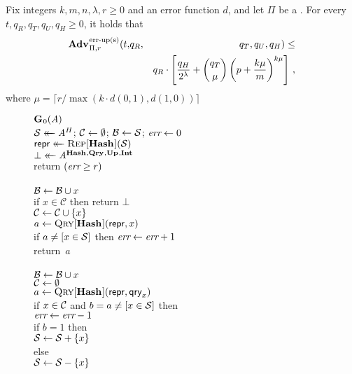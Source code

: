 \begin{theorem}\label{thm:count-bf-bound}
Fix integers $k, m, n, \lambda, r\geq 0$ and an error function $d$, and let $\Pi$ be a .
  For every $t, q_R, q_T, q_U, q_H \geq 0$, it holds that
  \begin{eqnarray*}
    \Adv{\erreps}_{\struct,r}(t,&q_R,& q_T, q_U, q_H) \leq \\ && q_R \cdot \left[\frac{q_H}{2^\lambda} + \binom{q_T}{\mu}\left(p+\frac{k\mu}{m}\right)^{k\mu}\right] \,,
\end{eqnarray*}
where $\mu = \lceil r/\max(k \cdot d(0,1), d(1,0)) \rceil$
\end{theorem}

\begin{figure*}
  {
    \underline{$\textup{\textbf{G}}\hspace{0.5pt}_0(\mathit{A})$}\\[2pt]
      $\mathcal{S} \mathrel{\leftarrow\mkern-14mu\leftarrow} \mathit{A}^H$; $\mathcal{C} \gets \emptyset$; $\mathcal{B} \gets \mathcal{S}$; $\textit{err} \gets 0$\\
      $\mathsf{repr} \mathrel{\leftarrow\mkern-14mu\leftarrow} \textnormal{\textsc{Rep}}[\textup{\textbf{Hash}}\hspace{0.5pt}](\mathcal{S})$\\
      $\bot \mathrel{\leftarrow\mkern-14mu\leftarrow} \mathit{A}^{\textup{\textbf{Hash}}\hspace{0.5pt},\textup{\textbf{Qry}}\hspace{0.5pt},\textup{\textbf{Up}}\hspace{0.5pt},\textup{\textbf{Int}}\hspace{0.5pt}}$\\
      return $(\textit{err} \geq r)$
    \\[6pt]
    \\[2pt]
      $\mathcal{B} \gets \mathcal{B} \cup x$\\
      if $x \in \mathcal{C}$ then return $\bot$\\
      $\mathcal{C} \gets \mathcal{C} \cup \{x\}$\\
      $a \gets \textnormal{\textsc{Qry}}[\textup{\textbf{Hash}}\hspace{0.5pt}](\mathsf{repr}, x)$\\
      if $a \neq [x \in \mathcal{S}]$ then $\textit{err} \gets \textit{err} + 1$\\
      return~$a$
    \\[6pt]
    \\[2pt]
      $\mathcal{B} \gets \mathcal{B} \cup x$\\
      $\mathcal{C} \gets \emptyset$\\
      $a \gets \textnormal{\textsc{Qry}}[\textup{\textbf{Hash}}\hspace{0.5pt}](\mathsf{repr}, \mathsf{qry}_x)$\\
      if $x \in \mathcal{C}$ and $b = a \neq [x \in \mathcal{S}]$ then\\
      \tab $\textit{err} \gets \textit{err}-1$\\
      if $b = 1$ then\\
      \tab $\mathcal{S} \gets \mathcal{S} + \{x\}$\\
      else\\
      \tab $\mathcal{S} \gets \mathcal{S} - \{x\}$\\
}
\end{figure*}
